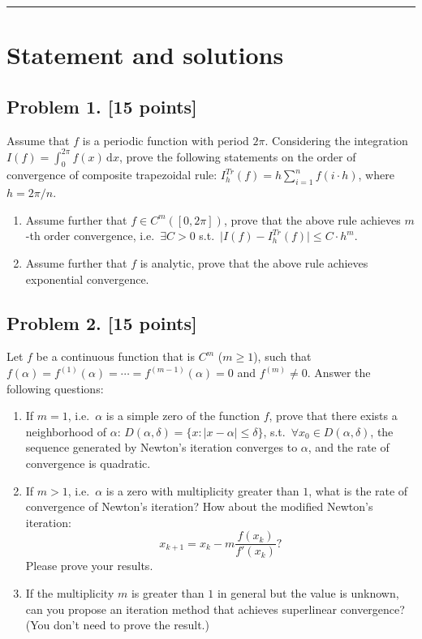 \documentclass[11pt,a4paper]{article}
\begin{document}
\noindent\rule{\linewidth}{0.4pt}

\section{Statement and solutions}

\subsection{Problem 1. [15 points]}
Assume that \(f\) is a periodic function with period \(2\pi\). Considering the integration \(I(f) = \int_{0}^{2\pi} f(x)\,\mathrm{d}x\), prove the following statements on the order of convergence of composite trapezoidal rule: \(I_{h}^{Tr}(f) = h \sum_{i=1}^{n} f(i \cdot h)\), where \(h = 2\pi/n\).
\begin{enumerate}[label=(\roman*)]
    \item Assume further that \(f \in C^{m}([0, 2\pi])\), prove that the above rule achieves \(m\)-th order convergence, i.e.\ \(\exists C > 0\) s.t.\ \(\lvert I(f) - I_{h}^{Tr}(f)\rvert \le C \cdot h^{m}\).
    \item Assume further that \(f\) is analytic, prove that the above rule achieves exponential convergence.
\end{enumerate}



\subsection{Problem 2. [15 points]}
Let \(f\) be a continuous function that is \(C^{m}\) (\(m \ge 1\)), such that \(f(\alpha) = f^{(1)}(\alpha) = \cdots = f^{(m-1)}(\alpha) = 0\) and \(f^{(m)} \neq 0\). Answer the following questions:
\begin{enumerate}[label=(\roman*)]
    \item If \(m = 1\), i.e.\ \(\alpha\) is a simple zero of the function \(f\), prove that there exists a neighborhood of \(\alpha\): \(D(\alpha, \delta) = \{x : |x - \alpha| \le \delta\}\), s.t.\ \(\forall x_{0} \in D(\alpha, \delta)\), the sequence generated by Newton's iteration converges to \(\alpha\), and the rate of convergence is quadratic.
    \item If \(m > 1\), i.e.\ \(\alpha\) is a zero with multiplicity greater than \(1\), what is the rate of convergence of Newton's iteration? How about the modified Newton's iteration:
    \[
    x_{k+1} = x_{k} - m \frac{f(x_{k})}{f'(x_{k})}?
    \]
    Please prove your results.
    \item If the multiplicity \(m\) is greater than \(1\) in general but the value is unknown, can you propose an iteration method that achieves superlinear convergence? (You don't need to prove the result.)
\end{enumerate}
\end{document}

